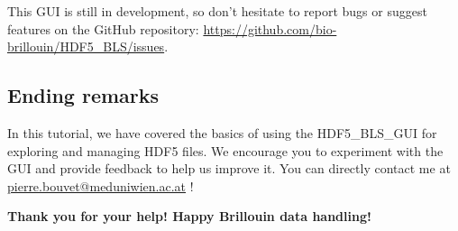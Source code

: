 \documentclass{article}
\begin{document}
This GUI is still in development, so don't hesitate to report bugs or suggest features on the GitHub repository: \url{https://github.com/bio-brillouin/HDF5_BLS/issues}.

\subsection{Ending remarks}

In this tutorial, we have covered the basics of using the HDF5\_BLS\_GUI for exploring and managing HDF5 files. We encourage you to experiment with the GUI and provide feedback to help us improve it. You can directly contact me at \href{mailto:pierre.bouvet@meduniwien.ac.at}{pierre.bouvet@meduniwien.ac.at} !

\vspace{5\baselineskip}

\begin{center}
\textbf{Thank you for your help! Happy Brillouin data handling!}
\end{center}
\end{document}

